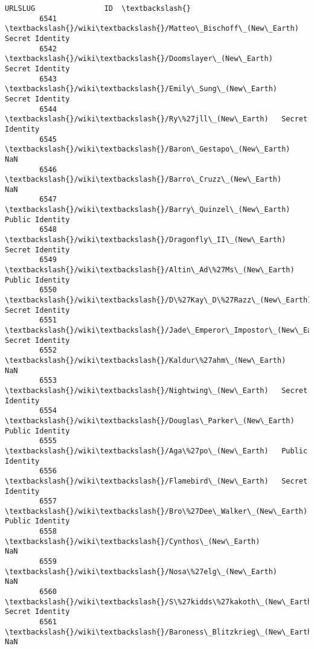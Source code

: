 \documentclass[11pt]{article}
\begin{document}
\begin{Verbatim}[commandchars=\\\{\}]
                                                         URLSLUG                ID  \textbackslash{}
        6541                 \textbackslash{}/wiki\textbackslash{}/Matteo\_Bischoff\_(New\_Earth)   Secret Identity   
        6542                      \textbackslash{}/wiki\textbackslash{}/Doomslayer\_(New\_Earth)   Secret Identity   
        6543                      \textbackslash{}/wiki\textbackslash{}/Emily\_Sung\_(New\_Earth)   Secret Identity   
        6544                        \textbackslash{}/wiki\textbackslash{}/Ry\%27jll\_(New\_Earth)   Secret Identity   
        6545                   \textbackslash{}/wiki\textbackslash{}/Baron\_Gestapo\_(New\_Earth)               NaN   
        6546                     \textbackslash{}/wiki\textbackslash{}/Barro\_Cruzz\_(New\_Earth)               NaN   
        6547                   \textbackslash{}/wiki\textbackslash{}/Barry\_Quinzel\_(New\_Earth)   Public Identity   
        6548                    \textbackslash{}/wiki\textbackslash{}/Dragonfly\_II\_(New\_Earth)   Secret Identity   
        6549                   \textbackslash{}/wiki\textbackslash{}/Altin\_Ad\%27Ms\_(New\_Earth)   Public Identity   
        6550                \textbackslash{}/wiki\textbackslash{}/D\%27Kay\_D\%27Razz\_(New\_Earth)   Secret Identity   
        6551           \textbackslash{}/wiki\textbackslash{}/Jade\_Emperor\_Impostor\_(New\_Earth)   Secret Identity   
        6552                    \textbackslash{}/wiki\textbackslash{}/Kaldur\%27ahm\_(New\_Earth)               NaN   
        6553                       \textbackslash{}/wiki\textbackslash{}/Nightwing\_(New\_Earth)   Secret Identity   
        6554                  \textbackslash{}/wiki\textbackslash{}/Douglas\_Parker\_(New\_Earth)   Public Identity   
        6555                        \textbackslash{}/wiki\textbackslash{}/Aga\%27po\_(New\_Earth)   Public Identity   
        6556                       \textbackslash{}/wiki\textbackslash{}/Flamebird\_(New\_Earth)   Secret Identity   
        6557                \textbackslash{}/wiki\textbackslash{}/Bro\%27Dee\_Walker\_(New\_Earth)   Public Identity   
        6558                         \textbackslash{}/wiki\textbackslash{}/Cynthos\_(New\_Earth)               NaN   
        6559                      \textbackslash{}/wiki\textbackslash{}/Nosa\%27elg\_(New\_Earth)               NaN   
        6560              \textbackslash{}/wiki\textbackslash{}/S\%27kidds\%27kakoth\_(New\_Earth)   Secret Identity   
        6561             \textbackslash{}/wiki\textbackslash{}/Baroness\_Blitzkrieg\_(New\_Earth)               NaN   

\end{Verbatim}
\end{document}
